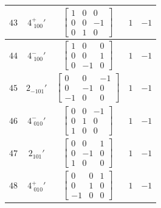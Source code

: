 \documentclass[fleqn,8pt]{jsarticle}
\begin{document}
\begin{longtable}{ccccc}
$ 43 $ & $ 4^{+}_{\,\,100}{}' $ & $ \begin{bmatrix} 1 & 0 & 0 \\ 0 & 0 & -1 \\ 0 & 1 & 0 \end{bmatrix} $ & $ 1 $ & $ -1 $ \\ \hline
$ 44 $ & $ 4^{-}_{\,\,100}{}' $ & $ \begin{bmatrix} 1 & 0 & 0 \\ 0 & 0 & 1 \\ 0 & -1 & 0 \end{bmatrix} $ & $ 1 $ & $ -1 $ \\ \hline
$ 45 $ & $ 2{}_{-101}{}' $ & $ \begin{bmatrix} 0 & 0 & -1 \\ 0 & -1 & 0 \\ -1 & 0 & 0 \end{bmatrix} $ & $ 1 $ & $ -1 $ \\ \hline
$ 46 $ & $ 4^{-}_{\,\,010}{}' $ & $ \begin{bmatrix} 0 & 0 & -1 \\ 0 & 1 & 0 \\ 1 & 0 & 0 \end{bmatrix} $ & $ 1 $ & $ -1 $ \\ \hline
$ 47 $ & $ 2{}_{101}{}' $ & $ \begin{bmatrix} 0 & 0 & 1 \\ 0 & -1 & 0 \\ 1 & 0 & 0 \end{bmatrix} $ & $ 1 $ & $ -1 $ \\ \hline
$ 48 $ & $ 4^{+}_{\,\,010}{}' $ & $ \begin{bmatrix} 0 & 0 & 1 \\ 0 & 1 & 0 \\ -1 & 0 & 0 \end{bmatrix} $ & $ 1 $ & $ -1 $ \\
\end{longtable}
\end{document}
